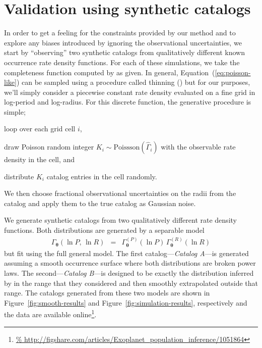 \documentclass[12pt,preprint]{aastex}
\newcommand{\figref}[1]{\ref{fig:#1}}
\newcommand{\Fig}[1]{Figure~\figref{#1}}
\newcommand{\fig}[1]{\Fig{#1}}
\newcommand{\Eq}[1]{Equation~(\ref{eq:#1})}
\newcommand{\eq}[1]{\Eq{#1}}
\newcommand{\sectlabel}[1]{\label{sect:#1}}
\newcommand{\bvec}[1]{\ensuremath{\boldsymbol{#1}}}
\newcommand{\rate}{\ensuremath{\Gamma}}
\newcommand{\ratepar}{{\ensuremath{\theta}}}
\newcommand{\ratepars}{{\ensuremath{\bvec{\ratepar}}}}
\newcommand{\obs}[1]{\ensuremath{\hat{#1}}}
\newcommand{\radius}{\ensuremath{R}}
\newcommand{\period}{\ensuremath{P}}
\newcommand{\modela}{\emph{Catalog A}}
\newcommand{\modelb}{\emph{Catalog B}}
\begin{document}
\section{Validation using synthetic catalogs}
\sectlabel{valid}

In order to get a feeling for the constraints provided by our method and to
explore any biases introduced by ignoring the observational uncertainties, we
start by ``observing'' two synthetic catalogs from qualitatively different
known occurrence rate density functions.
For each of these simulations, we take the completeness function computed by
\citet{petigura} as given.
In general, \eq{poisson-like} can be sampled using a procedure called thinning
(\citealt{poisson}) but for our purposes, we'll simply consider a piecewise
constant rate density evaluated on a fine grid in log-period and log-radius.
For this discrete function, the generative procedure is simple;
\begin{enumerate}
{\item loop over each grid cell $i$,}
{\item draw Poisson random integer $K_i\sim\mathrm{Poissson}(\obs{\rate}_i)$
with the observable rate density in the cell, and}
{\item distribute $K_i$ catalog entries in the cell randomly.}
\end{enumerate}
We then choose fractional observational uncertainties on the radii from the
\citet{petigura} catalog and apply them to the true catalog as Gaussian noise.

We generate synthetic catalogs from two qualitatively different rate density
functions.
Both distributions are generated by a separable model
\begin{eqnarray}
\rate_\ratepars (\ln\period,\,\ln\radius) &=&
    \rate_\ratepars^{(\period)}(\ln\period)\,
    \rate_\ratepars^{(\radius)}(\ln\radius)
\end{eqnarray}
but fit using the full general model.
The first catalog---\modela---is generated assuming a smooth occurrence
surface where both distributions are broken power laws.
The second---\modelb---is designed to be exactly the distribution inferred by
\citet{petigura} in the range that they considered and then smoothly
extrapolated outside that range.
The catalogs generated from these two models are shown in \fig{smooth-results}
and \fig{simulation-results}, respectively and the data are available
online\footnote{\url{%
http://figshare.com/articles/Exoplanet_population_inference/1051864}}.
\end{document}
